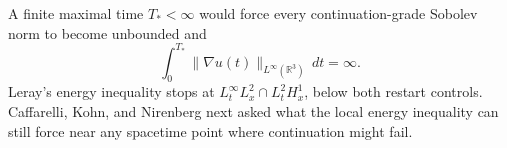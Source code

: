 A finite maximal time \(T_*<\infty\) would force every continuation-grade Sobolev norm to become unbounded and
\[
  \int_0^{T_*}
  \lVert\nabla u(t)\rVert_{L^\infty(\mathbb R^3)}\,dt
  =\infty.
\]
Leray's energy inequality stops at \(L^\infty_tL^2_x\cap L^2_tH^1_x\), below both restart controls.
Caffarelli, Kohn, and Nirenberg next asked what the local energy inequality can still force near any spacetime point where continuation might fail.
